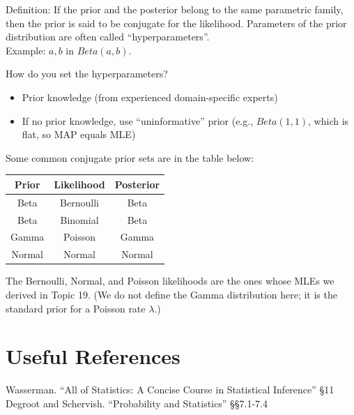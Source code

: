 \begin{aside}
Definition: If the prior and the posterior belong to the same parametric family, 
then the prior is said to be conjugate for the likelihood.
Parameters of the prior distribution
are often called ``hyperparameters''.\\
Example: $a,b$ in $Beta(a,b)$.
\vspace{1em}

How do you set the hyperparameters?
\begin{itemize}
\item Prior knowledge (from experienced domain-specific experts)
\item If no prior knowledge, use “uninformative” prior (e.g., $Beta(1,1)$, which is flat, so MAP equals MLE)
\end{itemize}
\vspace{1em}

Some common conjugate prior sets are in the table below:
\begin{center}\begin{tabular}{|c|c|c|}
\hline
Prior & Likelihood & Posterior\\
\hline\hline
Beta & Bernoulli & Beta\\
Beta & Binomial & Beta\\
Gamma & Poisson & Gamma\\
Normal & Normal & Normal\\
\hline
\end{tabular}\end{center}

The Bernoulli, Normal, and Poisson likelihoods are the ones whose MLEs we derived in Topic 19. 
(We do not define the Gamma distribution here; it is the standard prior for a Poisson rate $\lambda$.)

\end{aside}

\section*{Useful References}
Wasserman. ``All of Statistics: A Concise Course in Statistical Inference'' \S11
Degroot and Schervish. ``Probability and Statistics''  \S\S7.1-7.4


